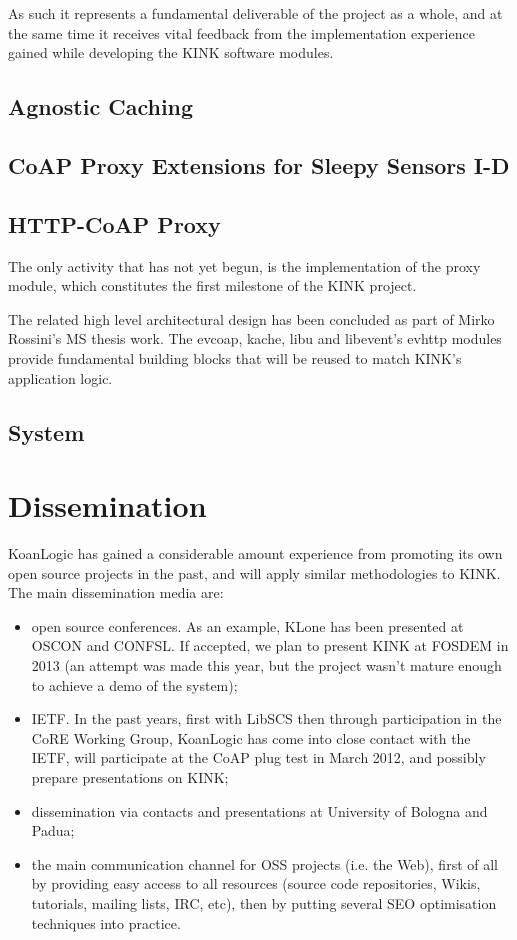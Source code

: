 \documentclass[12pt]{article}
\begin{document}
As such it represents a fundamental deliverable of the project as a whole, and at the same time it receives vital feedback from the implementation experience gained while developing the KINK software modules.

\subsection{Agnostic Caching}


\subsection{CoAP Proxy Extensions for Sleepy Sensors I-D}


\subsection{HTTP-CoAP Proxy}
The only activity that has not yet begun, is the implementation of the proxy module, which constitutes the first milestone of the KINK project. 

The related high level architectural design has been concluded as part of Mirko Rossini's MS thesis work.  The evcoap, kache, libu and libevent's evhttp modules provide fundamental building blocks that will be reused to match KINK's application logic.

\subsection{System}


\section{Dissemination}
KoanLogic has gained a considerable amount experience from promoting its own open source projects in the past, and will apply similar methodologies to KINK. The main dissemination media are:
\begin{itemize}
\item open source conferences. As an example, KLone has been presented at OSCON and CONFSL. If accepted, we plan to present KINK at FOSDEM in 2013 (an attempt was made this year, but the project wasn't mature enough to achieve a demo of the system);
\item IETF. In the past years, first with LibSCS then through participation in the CoRE Working Group, KoanLogic has come into close contact with the IETF, will participate at the CoAP plug test in March 2012, and possibly prepare presentations on KINK;
\item dissemination via contacts and presentations at University of Bologna and Padua;
\item the main communication channel for OSS projects (i.e. the Web), first of all by providing easy access to all resources (source code repositories, Wikis, tutorials, mailing lists, IRC, etc), then by putting several SEO optimisation techniques into practice.
\end{itemize}
\end{document}
